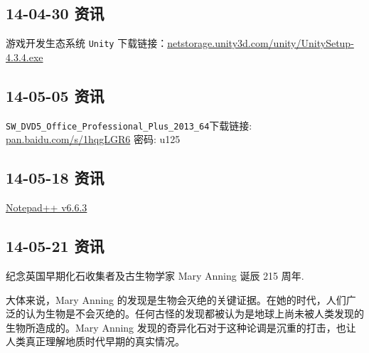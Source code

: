 \documentclass[]{report}
\begin{document}
	\subsection{14-04-30 资讯}
		游戏开发生态系统 \verb|Unity| 下载链接：\href{http://netstorage.unity3d.com/unity/UnitySetup-4.3.4.exe}{netstorage.unity3d.com/unity/UnitySetup-4.3.4.exe}
	\subsection{14-05-05 资讯}
		\verb|SW_DVD5_Office_Professional_Plus_2013_64|下载链接: \href{http://pan.baidu.com/s/1hqgLGR6}{pan.baidu.com/s/1hqgLGR6} 密码: u125
	\subsection{14-05-18 资讯}
		\href{http://notepad-plus-plus.org/zh/download/v6.6.3.html}{Notepad++ v6.6.3}	
	\subsection{14-05-21 资讯}
		纪念英国早期化石收集者及古生物学家 Mary Anning 诞辰 215 周年.
		
		大体来说，Mary Anning 的发现是生物会灭绝的关键证据。在她的时代，人们广泛的认为生物是不会灭绝的。任何古怪的发现都被认为是地球上尚未被人类发现的生物所造成的。Mary Anning 发现的奇异化石对于这种论调是沉重的打击，也让人类真正理解地质时代早期的真实情况。
\end{document}

